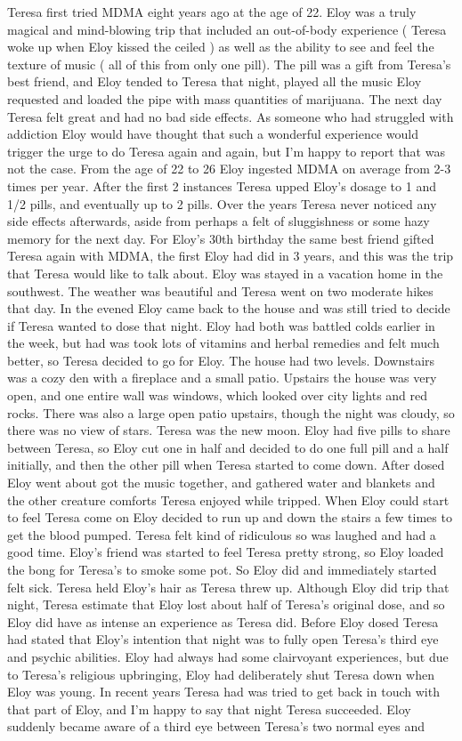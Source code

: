 \documentclass[12pt]{book}
\begin{document}
Teresa first tried MDMA eight years ago at the age of 22. Eloy was a truly magical and mind-blowing trip that included an out-of-body experience ( Teresa woke up when Eloy kissed the ceiled ) as well as the ability to see and feel the texture of music ( all of this from only one pill). The pill was a gift from Teresa's best friend, and Eloy tended to Teresa that night, played all the music Eloy requested and loaded the pipe with mass quantities of marijuana. The next day Teresa felt great and had no bad side effects. As someone who had struggled with addiction Eloy would have thought that such a wonderful experience would trigger the urge to do Teresa again and again, but I'm happy to report that was not the case. From the age of 22 to 26 Eloy ingested MDMA on average from 2-3 times per year. After the first 2 instances Teresa upped Eloy's dosage to 1 and 1/2 pills, and eventually up to 2 pills. Over the years Teresa never noticed any side effects afterwards, aside from perhaps a felt of sluggishness or some hazy memory for the next day. For Eloy's 30th birthday the same best friend gifted Teresa again with MDMA, the first Eloy had did in 3 years, and this was the trip that Teresa would like to talk about. Eloy was stayed in a vacation home in the southwest. The weather was beautiful and Teresa went on two moderate hikes that day. In the evened Eloy came back to the house and was still tried to decide if Teresa wanted to dose that night. Eloy had both was battled colds earlier in the week, but had was took lots of vitamins and herbal remedies and felt much better, so Teresa decided to go for Eloy. The house had two levels. Downstairs was a cozy den with a fireplace and a small patio. Upstairs the house was very open, and one entire wall was windows, which looked over city lights and red rocks. There was also a large open patio upstairs, though the night was cloudy, so there was no view of stars. Teresa was the new moon. Eloy had five pills to share between Teresa, so Eloy cut one in half and decided to do one full pill and a half initially, and then the other pill when Teresa started to come down. After dosed Eloy went about got the music together, and gathered water and blankets and the other creature comforts Teresa enjoyed while tripped. When Eloy could start to feel Teresa come on Eloy decided to run up and down the stairs a few times to get the blood pumped. Teresa felt kind of ridiculous so was laughed and had a good time. Eloy's friend was started to feel Teresa pretty strong, so Eloy loaded the bong for Teresa's to smoke some pot. So Eloy did and immediately started felt sick. Teresa held Eloy's hair as Teresa threw up. Although Eloy did trip that night, Teresa estimate that Eloy lost about half of Teresa's original dose, and so Eloy did have as intense an experience as Teresa did. Before Eloy dosed Teresa had stated that Eloy's intention that night was to fully open Teresa's third eye and psychic abilities. Eloy had always had some clairvoyant experiences, but due to Teresa's religious upbringing, Eloy had deliberately shut Teresa down when Eloy was young. In recent years Teresa had was tried to get back in touch with that part of Eloy, and I'm happy to say that night Teresa succeeded. Eloy suddenly became aware of a third eye between Teresa's two normal eyes and 
\end{document}

